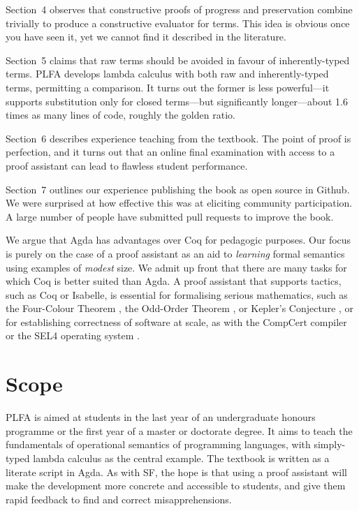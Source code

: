 \documentclass[preprint,authoryear]{elsarticle}
\begin{document}
Section~4 observes that constructive proofs of progress and
preservation combine trivially to produce a constructive evaluator for
terms.  This idea is obvious once you have seen it, yet we cannot
find it described in the literature.

Section~5 claims that raw terms should be avoided in favour of
inherently-typed terms.  PLFA develops lambda calculus with both raw
and inherently-typed terms, permitting a comparison.  It turns out the
former is less powerful---it supports substitution only for closed
terms---but significantly longer---about 1.6 times as many lines of code,
roughly the golden ratio.

Section~6 describes experience teaching from the textbook.  The point
of proof is perfection, and it turns out that an online final
examination with access to a proof assistant can lead to flawless
student performance.

Section~7 outlines our experience publishing the book as open source
in Github.  We were surprised at how effective this was at eliciting
community participation.  A large number of people have submitted pull
requests to improve the book.

We argue that Agda has advantages over Coq for
pedagogic purposes.  Our focus is purely on the case of a proof assistant
as an aid to \emph{learning} formal semantics using examples of
\emph{modest} size.  We admit up front that
there are many tasks for which Coq is better suited than Agda.
A proof assistant that supports tactics, such as Coq or Isabelle,
is essential for formalising serious mathematics,
such as the Four-Colour Theorem \citep{Gonthier-2008},
the Odd-Order Theorem \citep{Gonthier-et-al-2013},
or Kepler's Conjecture \citep{Hales-et-al-2017},
or for establishing correctness of software at scale,
as with the CompCert compiler \citep{Leroy-2009,Kastner-et-al-2017}
or the SEL4 operating system \citep{Klein-2009,O'Connor-2016}.

\section{Scope}

PLFA is aimed at students in the last year of an undergraduate
honours programme or the first year of a master or doctorate degree.
It aims to teach the fundamentals of operational semantics of
programming languages, with simply-typed lambda calculus as the
central example.  The textbook is written as a literate script in Agda.
As with SF, the hope is that using
a proof assistant will make the development more concrete
and accessible to students, and give them rapid feedback to find
and correct misapprehensions.
\end{document}
